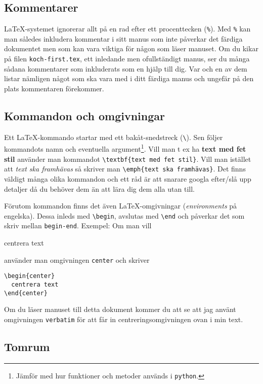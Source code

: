 \documentclass[a4paper,12pt]{article}
\begin{document}
\subsection{Kommentarer}

\LaTeX-systemet ignorerar allt på en rad efter ett procenttecken
(\verb!%!). Med \verb!%! kan man således inkludera kommentar i sitt
manus som inte påverkar det färdiga dokumentet men som kan vara
viktiga för någon som läser manuset. Om du kikar på filen
\texttt{koch-first.tex}, ett inledande men ofullständigt manus, ser du
många sådana kommentarer som inkluderats som en hjälp till dig. Var
och en av dem listar nämligen något som ska vara med i ditt färdiga
manus och ungefär på den plats kommentaren förekommer.  

\subsection{Kommandon och omgivningar}

Ett \LaTeX-kommando startar med ett bakåt-snedstreck (\verb!\!). Sen
följer kommandots namn och eventuella argument\footnote{Jämför med hur
  funktioner och metoder används i \texttt{python}.}. Vill man t ex ha
\textbf{text med fet stil} använder man kommandot \label{sec:textbf}
\verb!\textbf{text med fet stil}!. Vill man istället att \emph{text
  ska framhävas} så skriver man \verb!\emph{text ska framhävas}!. 
\label{sec:emph} Det finns väldigt många olika kommandon och ett råd
är att snarare googla efter/slå upp detaljer då du behöver dem än att
lära dig dem alla utan till. 

Förutom kommandon finns det även \LaTeX-omgivningar
(\textit{environments} på engelska). Dessa inleds med \verb!\begin!,
  avslutas med \verb!\end! och påverkar det som skriv mellan
\texttt{begin-end}. Exempel: Om man vill 
\begin{center}
  centrera text
\end{center}
använder man omgivningen \texttt{center} och skriver
\begin{verbatim}
\begin{center}
  centrera text
\end{center}
\end{verbatim}
Om du läser manuset till detta dokument kommer du att se att jag
använt omgivningen \texttt{verbatim} för att får in
centreringsomgivningen ovan i min text.  

\subsection{Tomrum}
\end{document}
